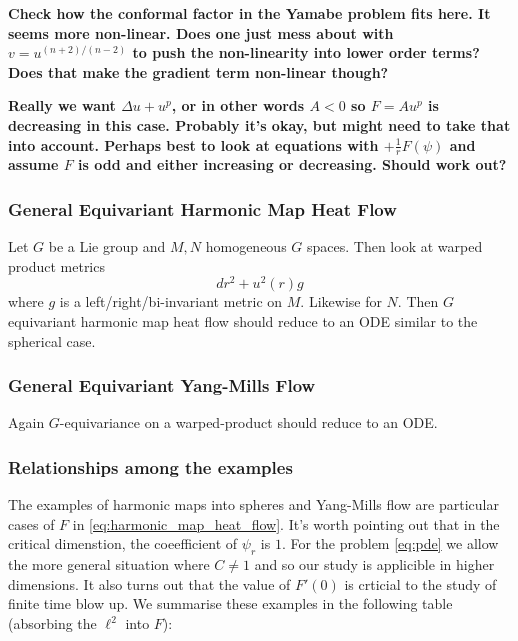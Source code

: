 \documentclass{amsart}
\begin{document}
\textbf{Check how the conformal factor in the Yamabe problem fits here. It seems more non-linear. Does one just mess about with \(v = u^{(n+2)/(n-2)}\) to push the non-linearity into lower order terms? Does that make the gradient term non-linear though?}

\textbf{Really we want \(\Delta u + u^p\), or in other words \(A<0\) so \(F = A u^p\) is decreasing in this case. Probably it's okay, but might need to take that into account. Perhaps best to look at equations with \(+ \frac{1}{r} F(\psi)\) and assume \(F\) is odd and either increasing or decreasing. Should work out?}

\subsubsection*{General Equivariant Harmonic Map Heat Flow}

Let \(G\) be a Lie group and \(M, N\) homogeneous \(G\) spaces. Then look at warped product metrics
\[
dr^2 + u^2(r) g
\]
where \(g\) is a left/right/bi-invariant metric on \(M\). Likewise for \(N\). Then \(G\) equivariant harmonic map heat flow should reduce to an ODE similar to the spherical case.

\subsubsection*{General Equivariant Yang-Mills Flow}

Again \(G\)-equivariance on a warped-product should reduce to an ODE.

\subsubsection*{Relationships among the examples}

The examples of harmonic maps into spheres and Yang-Mills flow are particular cases of \(F\) in \eqref{eq:harmonic_map_heat_flow}. It's worth pointing out that in the critical dimenstion, the coeefficient of \(\psi_r\) is \(1\). For the problem \eqref{eq:pde} we allow the more general situation where \(C \ne 1\) and so our study is applicible in higher dimensions. It also turns out that the value of \(F'(0)\) is crticial to the study of finite time blow up. We summarise these examples in the following table (absorbing the \(\ell^2\) into \(F\)):
\end{document}

